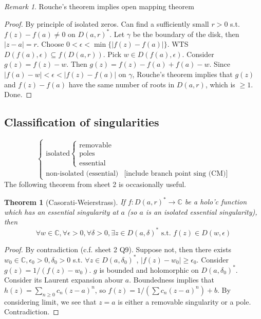 \documentclass{article}
\theoremstyle{definition}
\theoremstyle{remark}
\newtheorem{rem}{Remark}
\theoremstyle{plain}
\newtheorem{thm}[defn]{Theorem}
\newcommand{\CC}{\mathbb{C}}
\begin{document}
\begin{rem}
    Rouche's theorem implies open mapping theorem
\end{rem}
\begin{proof}
By principle of isolated zeros. Can find a sufficiently small $r>0$ s.t. $f(z)-f(a)\neq 0$ on $D(a,r)^\ast$. Let $\gamma$ be the boundary of the disk, then $|z-a|=r$. Choose $0<\epsilon<\min\{|f(z)-f(a)|\}$. WTS $D(f(a),\epsilon)\subseteq f(D(a,r))$. Pick $w\in D(f(a),\epsilon)$. Consider $g(z)=f(z)-w$. Then $g(z)=f(z)-f(a)+f(a)-w$. Since $|f(a)-w|<\epsilon<|f(z)-f(a)|$ on $\gamma$, Rouche's theorem implies that $g(z)$ and $f(z)-f(a)$ have the same number of roots in $D(a,r)$, which is $\ge 1$. Done.
\end{proof}

\subsection{Classification of singularities}
\[
\begin{cases}
    \text{isolated}\begin{cases}
        \text{removable}\\
        \text{poles}\\
        \text{essential}
    \end{cases}\\
    \text{non-isolated (essential)} & \text{[include branch point sing (CM)]}
\end{cases}
\]
The following theorem from sheet 2 is occasionally useful.
\begin{thm}[Casorati-Weierstrass]
If $f:D(a,r)^\ast\to\CC$ be a holo'c function which has an essential singularity at $a$ (so $a$ is an isolated essential singularity), then 
\[\forall w\in\CC,\forall\epsilon>0,\forall\delta>0,\exists z\in D(a,\delta)^\ast\text{ s.t. }f(z)\in D(w,\epsilon)\]
\end{thm}
\begin{proof}
    By contradiction (c.f. sheet 2 Q9). Suppose not, then there exists $w_0\in\CC,\epsilon_0>0,\delta_0>0$ s.t. $\forall z\in D(a,\delta_0)^\ast$, $|f(z)-w_0|\ge\epsilon_0$. Consider $g(z)=1/(f(z)-w_0)$. $g$ is bounded and holomorphic on $D(a,\delta_0)^\ast$. Consider its Laurent expansion abour $a$. Boundedness implies that $h(z)=\sum_{n\ge 0}c_n(z-a)^n$, so $f(z)=1/(\sum c_n(z-a)^n)+b$. By considering limit, we see that $z=a$ is either a removable singularity or a pole. Contradiction.
\end{proof}
\end{document}
